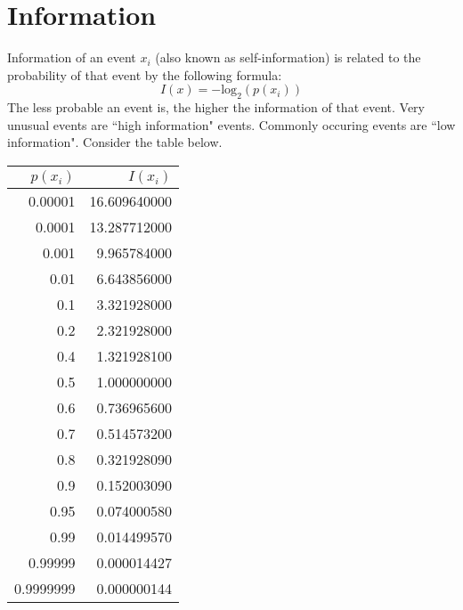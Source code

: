 \documentclass[]{article}
\begin{document}
\section{Information}

Information of an event $x_i$ (also known as self-information) is related to the probability of that event by the following formula:
\[  I(x) = -\mbox{log}_2 \left( p(x_i) \right) \]
The less probable an event is, the higher the information of that event. Very unusual events are ``high information" events. Commonly occuring events are ``low information". Consider the table below.
{
\large
\begin{center}
\begin{tabular}{|r|r|}
\hline $p(x_i)$	&	$I(x_i)$	\\ \hline
0.00001	&	16.609640000	\\ \hline
0.0001	&	13.287712000	\\ \hline
0.001	&	9.965784000	\\ \hline
0.01	&	6.643856000	\\ \hline
0.1	&	3.321928000	\\ \hline
0.2	&	2.321928000	\\ \hline
0.4	&	1.321928100	\\ \hline
0.5	&	1.000000000	\\ \hline
0.6	&	0.736965600	\\ \hline
0.7	&	0.514573200	\\ \hline
0.8	&	0.321928090	\\ \hline
0.9	&	0.152003090	\\ \hline
0.95	&	0.074000580	\\ \hline
0.99	&	0.014499570	\\ \hline
0.99999	&	0.000014427	\\ \hline
0.9999999	&	0.000000144	\\ \hline
\end{tabular} 
\end{center}
}
\end{document}
